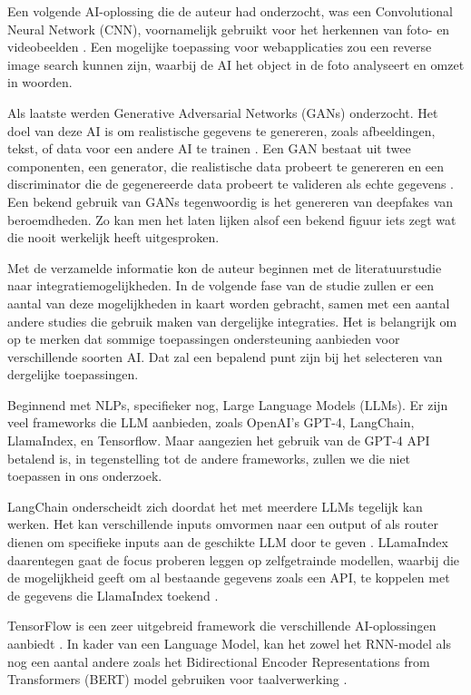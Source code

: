 \documentclass[dutch]{hogent-article}
\begin{document}
Een volgende AI-oplossing die de auteur had onderzocht, was een Convolutional Neural Network (CNN), voornamelijk gebruikt voor het herkennen van foto- en videobeelden \autocite{IBMCNN2023}. Een mogelijke toepassing voor webapplicaties zou een reverse image search kunnen zijn, waarbij de AI het object in de foto analyseert en omzet in woorden.

Als laatste werden Generative Adversarial Networks (GANs) onderzocht. Het doel van deze AI is om realistische gegevens te genereren, zoals afbeeldingen, tekst, of data voor een andere AI te trainen \autocite{Goodfellow2020}. Een GAN bestaat uit twee componenten, een generator, die realistische data probeert te genereren en een discriminator die de gegenereerde data probeert te valideren als echte gegevens \autocite{Goodfellow2020}. Een bekend gebruik van GANs tegenwoordig is het genereren van deepfakes van beroemdheden. Zo kan men het laten lijken alsof een bekend figuur iets zegt wat die nooit werkelijk heeft uitgesproken.

Met de verzamelde informatie kon de auteur beginnen met de literatuurstudie naar integratiemogelijkheden. In de volgende fase van de studie zullen er een aantal van deze mogelijkheden in kaart worden gebracht, samen met een aantal andere studies die gebruik maken van dergelijke integraties. Het is belangrijk om op te merken dat sommige toepassingen ondersteuning aanbieden voor verschillende soorten AI. Dat zal een bepalend punt zijn bij het selecteren van dergelijke toepassingen.

Beginnend met NLPs, specifieker nog, Large Language Models (LLMs). Er zijn veel frameworks die LLM aanbieden, zoals OpenAI’s GPT-4, LangChain, LlamaIndex, en Tensorflow. Maar aangezien het gebruik van de GPT-4 API betalend is, in tegenstelling tot de andere frameworks, zullen we die niet toepassen in ons onderzoek. 

LangChain onderscheidt zich doordat het met meerdere LLMs tegelijk kan werken. Het kan verschillende inputs omvormen naar een output of als router dienen om specifieke inputs aan de geschikte LLM door te geven \autocite{Topsakal2023CreatingLL}. LLamaIndex daarentegen gaat de focus proberen leggen op zelfgetrainde modellen, waarbij die de mogelijkheid geeft om al bestaande gegevens zoals een API, te koppelen met de gegevens die LlamaIndex toekend \autocite{Liu2022}.

TensorFlow is een zeer uitgebreid framework die verschillende AI-oplossingen aanbiedt \autocite{TensorFlow2022}. In kader van een Language Model, kan het zowel het RNN-model als nog een aantal andere zoals het Bidirectional Encoder Representations from Transformers (BERT) model gebruiken voor taalverwerking \autocite{Chollet2015}. 
\end{document}
